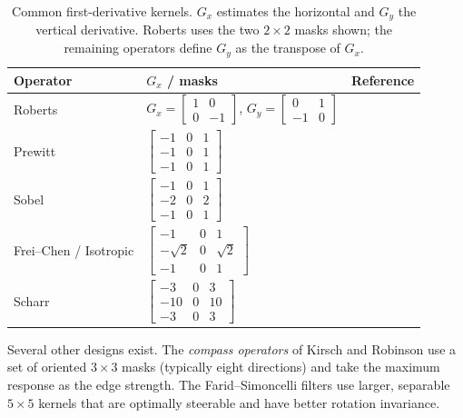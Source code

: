 \documentclass[conference]{IEEEtran}
\begin{document}
\begin{table}[!t]
\centering
\footnotesize
\caption{Common first-derivative kernels.  $G_x$ estimates the horizontal
and $G_y$ the vertical derivative.  Roberts uses the two $2\times2$ masks
shown; the remaining operators define $G_y$ as the transpose of $G_x$.}
\label{tab:kernels}
\setlength{\tabcolsep}{3pt}
\begin{tabular}{@{}lll@{}}
\toprule
Operator & $G_x$ / masks & Reference \\
\midrule
Roberts &
$G_x=\begin{bmatrix} 1 & 0 \\ 0 & -1 \end{bmatrix}$,
$G_y=\begin{bmatrix} 0 & 1 \\ -1 & 0 \end{bmatrix}$ & \cite{roberts} \\
\addlinespace
Prewitt &
$\begin{bmatrix} -1 & 0 & 1 \\ -1 & 0 & 1 \\ -1 & 0 & 1 \end{bmatrix}$ & \cite{prewitt} \\
\addlinespace
Sobel &
$\begin{bmatrix} -1 & 0 & 1 \\ -2 & 0 & 2 \\ -1 & 0 & 1 \end{bmatrix}$ & \cite{sobel} \\
\addlinespace
Frei--Chen / Isotropic &
$\begin{bmatrix} -1 & 0 & 1 \\ -\sqrt{2} & 0 & \sqrt{2} \\ -1 & 0 & 1 \end{bmatrix}$ & \cite{freichen} \\
\addlinespace
Scharr &
$\begin{bmatrix} -3 & 0 & 3 \\ -10 & 0 & 10 \\ -3 & 0 & 3 \end{bmatrix}$ & \cite{scharr} \\
\bottomrule
\end{tabular}
\end{table}

Several other designs exist.  The \emph{compass operators} of Kirsch
\cite{kirsch} and Robinson \cite{robinson} use a set of oriented
$3\times3$ masks (typically eight directions) and take the maximum response
as the edge strength.  The Farid--Simoncelli filters use larger, separable
$5\times5$ kernels that are optimally steerable and have better rotation
invariance\cite{farid,farid1997}.
\end{document}
